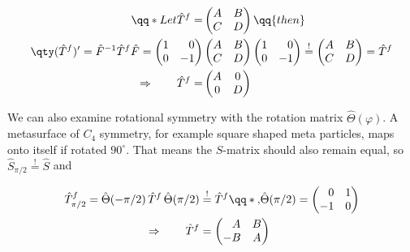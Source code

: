 \begin{equation}
\begin{aligned}
    \qq*{Let} \hat T^f =
    &\begin{pmatrix}
        A & B \\
        C & D
    \end{pmatrix}
    \qq{then} \\
    \qty(\hat T^f)' =
    \hat F^{-1} \hat T^f \hat F =
    \begin{pmatrix}
        1 & \phantom{-} 0 \\
        0 & -           1
    \end{pmatrix}
    &\begin{pmatrix}
        A & B \\
        C & D
    \end{pmatrix}
    \begin{pmatrix}
        1 & \phantom{-} 0 \\
        0 & -           1
    \end{pmatrix}
    \stackrel{!}{=}
    \begin{pmatrix}
        A & B \\
        C & D
    \end{pmatrix} =
    \hat T^f \\
    \Rightarrow \qquad
    \hat T^f =
    &\begin{pmatrix}
        A & 0 \\
        0 & D
    \end{pmatrix}
\end{aligned}
\end{equation}

We can also examine rotational symmetry with the rotation matrix $\hat \Theta(\varphi)$. A metasurface of $C_4$ symmetry, for example square shaped meta particles, maps onto itself if rotated $90^\circ$. That means the $S$-matrix should also remain equal, so
$\hat S_{\pi/2} \stackrel{!}{=} \hat S$
and

\begin{equation}
\begin{aligned}
    \hat T^f_{\pi/2} =
    \hat \Theta(-\pi/2) \,
    \hat T^f \,
    \hat \Theta(\pi/2)
    &\stackrel{!}{=}
    \hat T^f
    \qq*{,}
    \hat \Theta(\pi/2) =
    \begin{pmatrix}
        \phantom{-} 0 & 1 \\
        -1 & 0
    \end{pmatrix} \\
    \Rightarrow \qquad
    \hat T^f &=
    \begin{pmatrix}
        \phantom{-} A & B \\
        -           B & A
    \end{pmatrix}
\end{aligned}
\end{equation}

